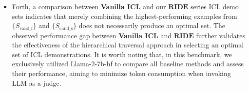 \begin{itemize}
 \item Forth, a comparison between \textbf{Vanilla ICL} and our $\textbf{RIDE}$ series ICL demo sets indicates that merely combining the highest-performing examples from $\{S_\text{cand\_f}\}$ and $\{S_\text{cand\_s}\}$ does not necessarily produce an optimal set.
The observed performance gap between \textbf{Vanilla ICL} and $\textbf{RIDE}$ further validates the effectiveness of the hierarchical traversal approach in selecting an optimal set of ICL demonstrations.
It is worth noting that, in this benchmark, we exclusively utilized Llama-2-7b-hf to compare all baseline methods and assess their performance, aiming to minimize token consumption when invoking LLM-as-a-judge.

\end{itemize}